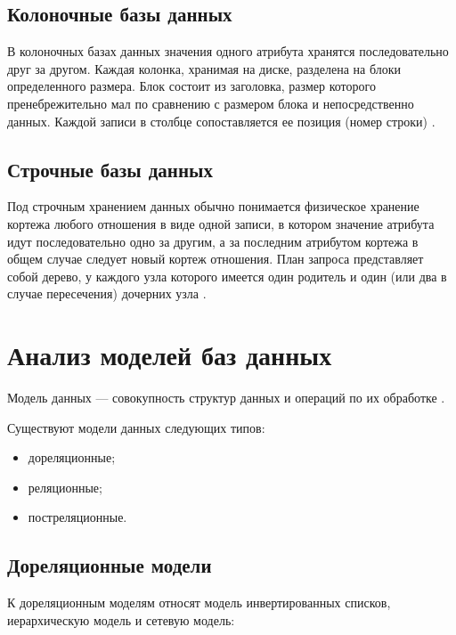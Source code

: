 \subsection{Колоночные базы данных}
В колоночных базах данных значения одного атрибута хранятся последовательно друг за другом.
Каждая колонка, хранимая на диске, разделена на блоки определенного размера.
Блок состоит из заголовка, размер которого пренебрежительно мал по сравнению с размером блока и непосредственно данных.
Каждой записи в столбце сопоставляется ее позиция (номер строки) \cite{strokovie_and_kolonochnie_bd}.
\subsection{Строчные базы данных}
Под строчным хранением данных обычно понимается физическое хранение кортежа любого отношения в виде одной записи, в котором значение атрибута идут последовательно одно за другим, а за последним атрибутом кортежа в общем случае следует новый кортеж отношения.
План запроса представляет собой дерево, у каждого узла которого имеется один родитель и один (или два в случае пересечения) дочерних узла
\cite{strokovie_and_kolonochnie_bd}.



\section{Анализ моделей баз данных}
Модель данных --- совокупность структур данных и операций по их обработке \cite{dbms}.

Существуют модели данных следующих типов:
\begin{itemize}
	\item дореляционные;
	\item реляционные;
	\item постреляционные.
\end{itemize}

\subsection{Дореляционные модели}
К дореляционным моделям относят модель инвертированных списков, иерархическую модель и сетевую модель:

